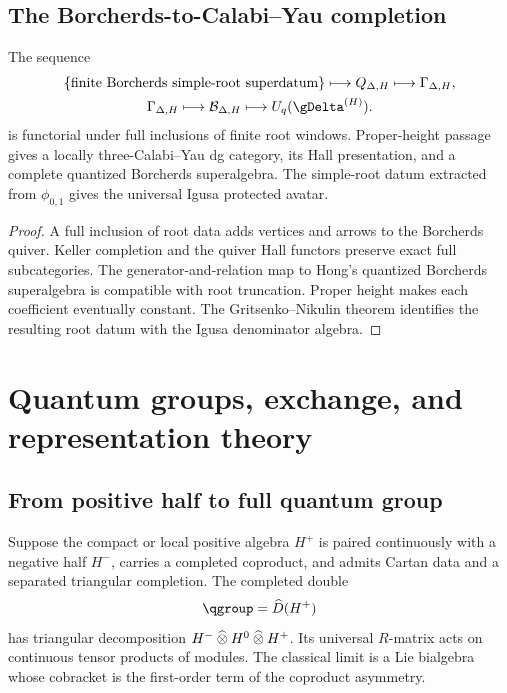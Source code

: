 \chapter{The Borcherds-to-Calabi--Yau completion}
\begin{theorem}
The sequence
\[
\begin{gathered}
 \set{\text{finite Borcherds simple-root superdatum}}
 \longmapsto Q_{\Delta,H}
 \longmapsto \Gamma_{\Delta,H},\\
 \Gamma_{\Delta,H}
 \longmapsto \mathcal B_{\Delta,H}
 \longmapsto U_q(\gDelta^{(H)}).
\end{gathered}
\]
is functorial under full inclusions of finite root windows.  Proper-height passage gives a locally three-Calabi--Yau dg category, its Hall presentation, and a complete quantized Borcherds superalgebra.  The simple-root datum extracted from $\phi_{0,1}$ gives the universal Igusa protected avatar.
\end{theorem}
\begin{proof}
A full inclusion of root data adds vertices and arrows to the Borcherds quiver.  Keller completion and the quiver Hall functors preserve exact full subcategories.  The generator-and-relation map to Hong's quantized Borcherds superalgebra is compatible with root truncation.  Proper height makes each coefficient eventually constant.  The Gritsenko--Nikulin theorem identifies the resulting root datum with the Igusa denominator algebra.
\end{proof}


\part{Quantum groups, exchange, and representation theory}

\chapter{From positive half to full quantum group}
Suppose the compact or local positive algebra $H^+$ is paired continuously with a negative half $H^-$, carries a completed coproduct, and admits Cartan data and a separated triangular completion. The completed double
\[
 \qgroup=\widehat D(H^+)
\]
has triangular decomposition $H^-\mathbin{\widehat\otimes} H^0\mathbin{\widehat\otimes} H^+$. Its universal $R$-matrix acts on continuous tensor products of modules. The classical limit is a Lie bialgebra whose cobracket is the first-order term of the coproduct asymmetry.

